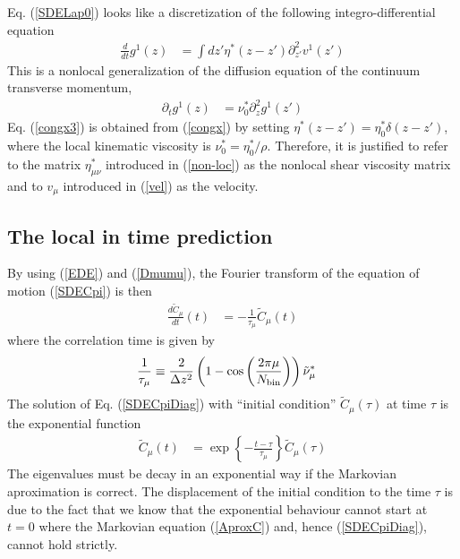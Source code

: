 \documentclass[a4paper,openright,12pt]{book}
\begin{document}
Eq. (\ref{SDELap0}) looks    like    a   discretization    of    the    following
integro-differential  equation
\begin{align}
  \frac{d}{dt} g^1(z)&=\int dz'{\eta}^*(z-z')\partial^2_{z'} v^1(z')
\label{congx}
\end{align}
This is  a nonlocal generalization  of the diffusion equation  of the
continuum transverse  momentum,
\begin{align}
  \partial_t g^1(z)&=\nu^*_0\partial^2_{z}g^1(z')
\label{congx3}
\end{align}
Eq.   (\ref{congx3})   is  obtained  from  (\ref{congx})   by  setting
$\eta^*(z-z')=\eta^*_0\delta(z-z')$,   where   the   local   kinematic
viscosity is  $\nu^*_0=\eta^*_0/\rho$.  Therefore, it is  justified to
refer to the matrix $\eta^*_{\mu\nu}$ introduced in (\ref{non-loc}) as
the  nonlocal shear  viscosity matrix  and to  $v_\mu$ introduced  in
(\ref{vel}) as the velocity.


\subsection{The local in time prediction}
By using (\ref{EDE})  and (\ref{Dmumu}), the Fourier  transform of the
equation of motion (\ref{SDECpi}) is then
\begin{align}
  \frac{d\tilde{C}_\mu}{dt}(t)&=-\frac{1}{\tau_\mu}\tilde{C}_\mu(t)  
\label{SDECpiDiag}
\end{align}
where the correlation time is given by 
\begin{align}
 \frac{1}{\tau_\mu}&\equiv \frac{2}{\Delta z^2}
\left(1-\cos\left( \frac{2\pi \mu}{N_{\rm bin}}\right)\right)
\tilde{\nu}_\mu^*
\label{taumu}
\end{align}
The  solution of  Eq.  (\ref{SDECpiDiag})  with ``initial  condition''
$\tilde{C}_\mu(\tau)$ at time $\tau$ is the exponential function
\begin{align}
  \tilde{C}_\mu(t)&=\exp\left\{-\frac{t-\tau}{\tau_\mu}\right\}  \tilde{C}_\mu(\tau)
\label{solexp}
\end{align}
The eigenvalues must be decay in an exponential way if the Markovian aproximation is correct. 
The displacement of the initial condition to the time $\tau$ is due to
the fact that  we know that the exponential behaviour  cannot start at
$t=0$  where   the  Markovian  equation  (\ref{AproxC})   and,  hence
(\ref{SDECpiDiag}), cannot hold strictly.
\end{document}

